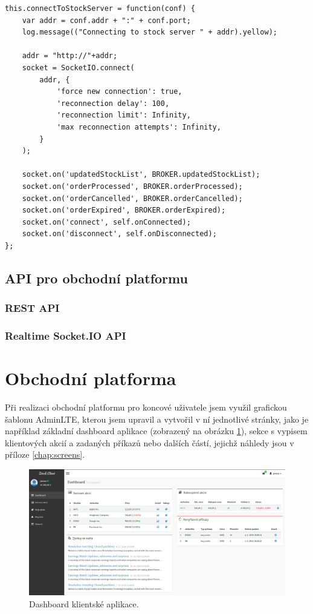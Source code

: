 \documentclass[thesis=M,czech]{FITthesis}[2012/06/26]
\begin{document}
\begin{lstlisting}[basicstyle={\tiny\ttfamily}, frame=single] 
this.connectToStockServer = function(conf) {
    var addr = conf.addr + ":" + conf.port;
    log.message(("Connecting to stock server " + addr).yellow);

    addr = "http://"+addr;
    socket = SocketIO.connect(
        addr, {
            'force new connection': true,
            'reconnection delay': 100,
            'reconnection limit': Infinity,
            'max reconnection attempts': Infinity,
        }
    );

    socket.on('updatedStockList', BROKER.updatedStockList);
    socket.on('orderProcessed', BROKER.orderProcessed);
    socket.on('orderCancelled', BROKER.orderCancelled);
    socket.on('orderExpired', BROKER.orderExpired);
    socket.on('connect', self.onConnected);
    socket.on('disconnect', self.onDisconnected);
};
\end{lstlisting}

\subsection{API pro obchodní platformu}

\subsubsection{REST API}
\subsubsection{Realtime Socket.IO API}

\section{Obchodní platforma}
	
	Při realizaci obchodní platformu pro koncové uživatele jsem využil grafickou šablonu AdminLTE, kterou jsem upravil a vytvořil v ní jednotlivé stránky, jako je například základní dashboard aplikace (zobrazený na obrázku \ref{fig:dasboard}), sekce s vypisem klientových akcií a zadaných příkazů nebo dalších částí, jejichž náhledy jsou v příloze \ref{chap:screens}.

\begin{figure}[h]
	\centering
	\includegraphics[width=1\textwidth]{images/dashboard}
 	\caption[Dashboard klientské aplikace]{Dashboard klientské aplikace.}
 	\label{fig:dasboard} 	
\end{figure}
	
\end{document}

